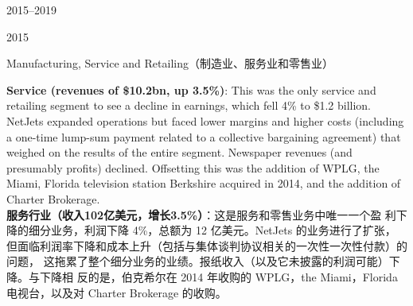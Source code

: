 \begin{chapter}{2015--2019}
\begin{section}{2015}
\begin{subsection}{Manufacturing, Service and Retailing（制造业、服务业和零售业）}
\begin{verseparallel}
  {
    \textbf{Service (revenues of \$10.2bn, up 3.5\%)}: This was the only service
    and retailing segment to see a decline in earnings, which fell 4\% to \$1.2
    billion. NetJets expanded operations but faced lower margins and higher
    costs (including a one-time lump-sum payment related to a collective
    bargaining agreement) that weighed on the results of the entire segment.
    Newspaper revenues (and presumably profits) declined. Offsetting this was
    the addition of WPLG, the Miami, Florida television station Berkshire
    acquired in 2014, and the addition of Charter Brokerage. \\
  }
  {
    \textbf{服务行业（收入102亿美元，增长3.5\%）}：这是服务和零售业务中唯一一个盈
    利下降的细分业务，利润下降 4\%，总额为 12 亿美元。NetJets 的业务进行了扩张，
    但面临利润率下降和成本上升（包括与集体谈判协议相关的一次性一次性付款）的问题，
    这拖累了整个细分业务的业绩。报纸收入（以及它未披露的利润可能）下降。与下降相
    反的是，伯克希尔在 2014 年收购的 WPLG，the Miami，Florida 电视台，以及对
    Charter Brokerage 的收购。
  }
\end{verseparallel}

\begin{verseparallel}
  {

}
\end{verseparallel}
\end{subsection}
\end{section}
\end{chapter}
